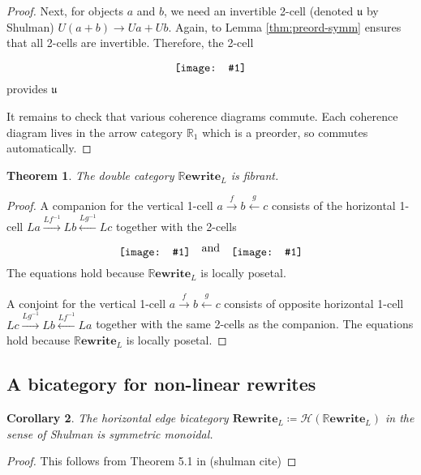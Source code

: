 \documentclass{amsart}
\newcommand{\RR}{\mathbb{R}}
\newcommand{\xto}[1]{\xrightarrow{#1}}
\newcommand{\xgets}[1]{\xleftarrow{#1}}
\newcommand{\diagram}[1]{\raisebox{-0.5\height}{\texttt{[image: \#1]}}}
\newcommand{\Rewrite}{\mathbf{Rewrite} }
\newcommand{\RRewrite}{ \mathbb{R}\mathbf{ewrite} }
\newcommand{\edit}[1]{\textcolor{editcolour}{(#1)}}
\newtheorem{theorem}{Theorem}[section]
\newtheorem{corollary}[theorem]{Corollary}
\theoremstyle{remark}
\theoremstyle{definition}
\begin{document}
\begin{proof}
  Next, for objects $ a $ and $ b $, we need an invertible 2-cell
  (denoted $ \mathfrak{u} $ by Shulman) $ U(a + b) \to Ua + Ub
  $. Again, to Lemma \ref{thm:preord-symm} ensures that all 2-cells
  are invertible.  Therefore, the 2-cell
  \[
    \diagram{diag_nlr_dbl-rewrite-unit-functor-2cell}
  \]
  provides $ \mathfrak{u} $
	
  It remains to check that various coherence diagrams commute.  Each
  coherence diagram lives in the arrow category $ \RR_1 $ which is a
  preorder, so commutes automatically.
\end{proof}

\begin{theorem} \label{thm:dbl-rewr-fibrant}
  The double category $ \RRewrite_L $ is fibrant.
\end{theorem}

\begin{proof}
  A companion for the vertical 1-cell $ a \xto{f} b \xgets{g} c $
  consists of the horizontal 1-cell
  $ La \xto{Lf^{-1}} Lb \xgets{Lg^{-1}} Lc $ together with the 2-cells
  \[
    \diagram{diag_nlr_dbl-rewrite-companion1}
    \quad \text{and} \quad
    \diagram{diag_nlr_dbl-rewrite-companion2}
  \]
  The equations hold because $ \RRewrite_L $ is locally posetal.
	
  A conjoint for the vertical 1-cell $ a \xto{f} b \xgets{g} c $
  consists of opposite horizontal 1-cell
  $ Lc \xto{Lg^{-1}} Lb \xgets{Lf^{-1}} La $ together with the same
  2-cells as the companion.  The equations hold because
  $ \RRewrite_L $ is locally posetal.
\end{proof}	


\subsection{A bicategory for non-linear rewrites}
\label{sec:bicat-nonlinr-rewr}

\begin{corollary} \label{thm:bicat-rewr-smc}
  The horizontal edge bicategory
  $ \Rewrite_{L} \coloneqq \mathcal{H} \left( \RRewrite_{L} \right) $
  in the sense of Shulman is symmetric monoidal.
\end{corollary}

\begin{proof}
  This follows from Theorem 5.1 in \edit{shulman cite} 
\end{proof} 
\end{document}
